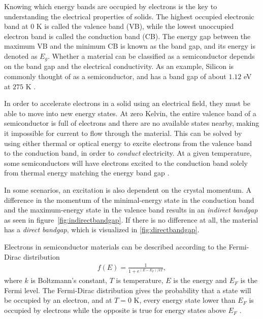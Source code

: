 Knowing which energy bands are occupied by electrons is the key to understanding the electrical properties of solids. The highest occupied electronic band at $0$ K is called the valence band (VB), while the lowest unoccupied electron band is called the conduction band (CB). The energy gap between the maximum VB and the minimum CB is known as the band gap, and its energy is denoted as $E_g$. Whether a material can be classified as a semiconductor depends on the band gap and the electrical conductivity. As an example, Silicon is commonly thought of as a semiconductor, and has a band gap of about $1.12$ eV at $275$ K \cite{Martienssen2005}.

In order to accelerate electrons in a solid using an electrical field, they must be able to move into new energy states. At zero Kelvin, the entire valence band of a semiconductor is full of electrons and there are no available states nearby, making it impossible for current to flow through the material. This can be solved by using either thermal or optical energy to excite electrons from the valence band to the conduction band, in order to \textit{conduct} electricity. At a given temperature, some semiconductors will have electrons excited to the conduction band solely from thermal energy matching the energy band gap \cite{BenStreetman2015}.



In some scenarios, an excitation is also dependent on the crystal momentum.
A difference in the momentum of the minimal-energy state in the conduction band and the maximum-energy state in the valence band results in an \textit{indirect bandgap} as seen in figure \autoref{fig:indirectbandgap}. If there is no difference at all, the material has a \textit{direct bandgap}, which is visualized in \autoref{fig:directbandgap}.

Electrons in semiconductor materials can be described according to the Fermi-Dirac distribution
\begin{align*}
  f(E) = \frac{1}{1+e^{(E-E_F)/kT}},
\end{align*}
where $k$ is Boltzmann's constant, $T$ is temperature, $E$ is the energy and $E_F$ is the Fermi level. The Fermi-Dirac distribution gives the probability that a state will be occupied by an electron, and at $T=0$ K, every energy state lower than $E_F$ is occupied by electrons while the opposite is true for energy states above $E_F$ \cite{BenStreetman2015}.


